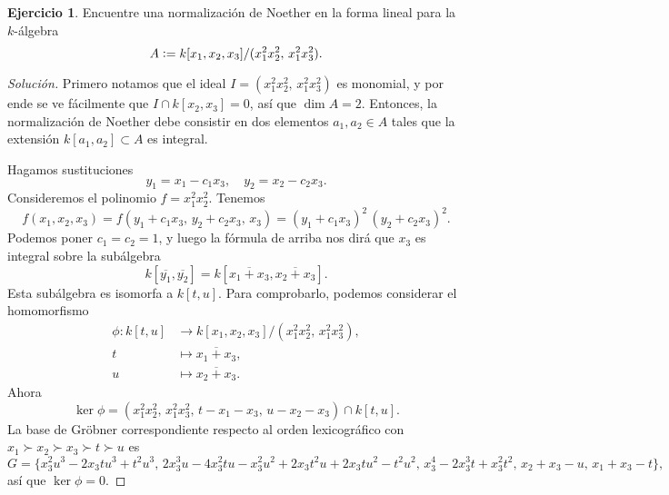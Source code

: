 \documentclass{article}
\theoremstyle{definition}
\newtheorem{ejerc}{Ejercicio}
\newenvironment{solucion}{\begin{proof}[Solución]}{\end{proof}}
\begin{document}
\begin{ejerc}
  Encuentre una normalización de Noether en la forma lineal para la $k$-álgebra
  $$A \mathrel{\mathop:}= k [x_1,x_2,x_3] / (x_1^2 x_2^2, \, x_1^2 x_3^2).$$

  \ifdefined\solutions\begin{solucion}
    Primero notamos que el ideal $I = (x_1^2 x_2^2, \, x_1^2 x_3^2)$ es
    monomial, y por ende se ve fácilmente que $I \cap k[x_2,x_3] = 0$, así que
    $\dim A = 2$. Entonces, la normalización de Noether debe consistir en dos
    elementos $a_1,a_2 \in A$ tales que la extensión $k [a_1,a_2] \subset A$ es
    integral.

    Hagamos sustituciones
    $$y_1 = x_1 - c_1 x_3, \quad y_2 = x_2 - c_2 x_3.$$
    Consideremos el polinomio $f = x_1^2 x_2^2$. Tenemos
    \[ f (x_1,x_2,x_3) =
       f (y_1 + c_1 x_3, \, y_2 + c_2 x_3, \, x_3) =
       (y_1 + c_1 x_3)^2\,(y_2 + c_2 x_3)^2. \]
    Podemos poner $c_1 = c_2 = 1$, y luego la fórmula de arriba nos dirá que
    $x_3$ es integral sobre la subálgebra
    \[ k [\overline{y_1},\overline{y_2}] =
       k [\overline{x_1 + x_3},\overline{x_2 + x_3}]. \]
    Esta subálgebra es isomorfa a $k [t,u]$. Para comprobarlo, podemos
    considerar el homomorfismo
    \begin{align*}
      \phi\colon k[t,u] & \to k [x_1,x_2,x_3] / (x_1^2 x_2^2, \, x_1^2 x_3^2),\\
      t & \mapsto \overline{x_1 + x_3},\\
      u & \mapsto \overline{x_2 + x_3}.
    \end{align*}
    Ahora
    \[ \ker \phi =
       (x_1^2x_2^2,\, x_1^2x_3^2,\, t-x_1-x_3,\, u-x_2-x_3) \cap k [t,u]. \]
    La base de Gröbner correspondiente respecto al orden lexicográfico con
    $x_1 \succ x_2 \succ x_3 \succ t \succ u$ es
    \[ G = \{ x_3^2 u^3 - 2 x_3 tu^3 + t^2u^3, \,
              2x_3^3u-4x_3^2tu -x_3^2u^2+2x_3t^2u+2x_3tu^2-t^2u^2, \,
              x_3^4-2x_3^3t+x_3^2t^2, \,
              x_2+x_3-u, \,
              x_1+x_3-t \}, \]
    así que $\ker \phi = 0$.
  \end{solucion}\fi
\end{ejerc}
\end{document}
